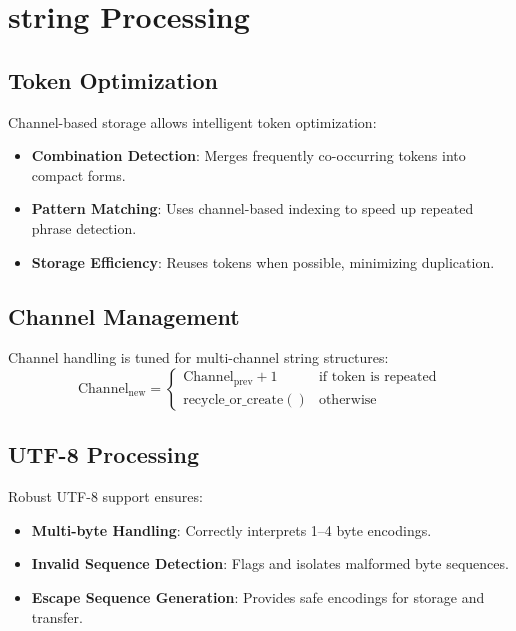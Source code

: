 \documentclass[12pt, a4paper]{article}
\begin{document}
\section{string Processing}\label{Sec:strings}
\subsection{Token Optimization}
Channel-based storage allows intelligent token optimization:
\begin{itemize}
    \item \textbf{Combination Detection}: Merges frequently co-occurring tokens into compact forms.
    \item \textbf{Pattern Matching}: Uses channel-based indexing to speed up repeated phrase detection.
    \item \textbf{Storage Efficiency}: Reuses tokens when possible, minimizing duplication.
\end{itemize}

\subsection{Channel Management}
Channel handling is tuned for multi-channel string structures:
\begin{equation}
    \mathrm{Channel}_{\mathrm{new}} = 
    \begin{cases}
        \mathrm{Channel}_{\mathrm{prev}} + 1 & \text{if token is repeated}\\
        \mathrm{recycle\_or\_create()} & \text{otherwise}
    \end{cases}
\end{equation}

\subsection{UTF-8 Processing}
Robust UTF-8 support ensures:
\begin{itemize}
    \item \textbf{Multi-byte Handling}: Correctly interprets 1--4 byte encodings.
    \item \textbf{Invalid Sequence Detection}: Flags and isolates malformed byte sequences.
    \item \textbf{Escape Sequence Generation}: Provides safe encodings for storage and transfer.
\end{itemize}
\end{document}

